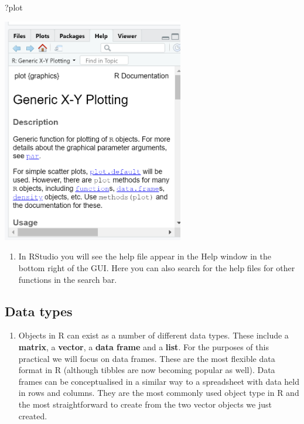 \documentclass[]{book}
\newenvironment{Shaded}{\begin{snugshade}}{\end{snugshade}}
\newcommand{\NormalTok}[1]{#1}
\providecommand{\tightlist}{%
  \setlength{\itemsep}{0pt}\setlength{\parskip}{0pt}}
\begin{document}
\begin{Shaded}
\begin{Highlighting}[]
\NormalTok{?plot}
\end{Highlighting}
\end{Shaded}

\begin{center}\includegraphics[width=300px]{prac2_images/rhelp} \end{center}

\begin{enumerate}
\def\labelenumi{\arabic{enumi}.}
\setcounter{enumi}{15}
\tightlist
\item
  In RStudio you will see the help file appear in the Help window in the bottom right of the GUI. Here you can also search for the help files for other functions in the search bar.
\end{enumerate}

\hypertarget{data-types}{%
\subsection{Data types}\label{data-types}}

\begin{enumerate}
\def\labelenumi{\arabic{enumi}.}
\setcounter{enumi}{16}
\tightlist
\item
  Objects in R can exist as a number of different data types. These include a \textbf{matrix}, a \textbf{vector}, a \textbf{data frame} and a \textbf{list}. For the purposes of this practical we will focus on data frames. These are the most flexible data format in R (although tibbles are now becoming popular as well). Data frames can be conceptualised in a similar way to a spreadsheet with data held in rows and columns. They are the most commonly used object type in R and the most straightforward to create from the two vector objects we just created.
\end{enumerate}
\end{document}

